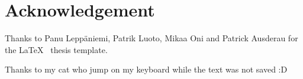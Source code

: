 
\pagestyle{empty}
\chapter*{Acknowledgement}

Thanks to Panu Leppäniemi, Patrik Luoto, Mikaa Oni and Patrick Ausderau for the \LaTeX{} ~thesis template.

Thanks to my cat who jump on my keyboard while the text was not saved :D

\clearpage

